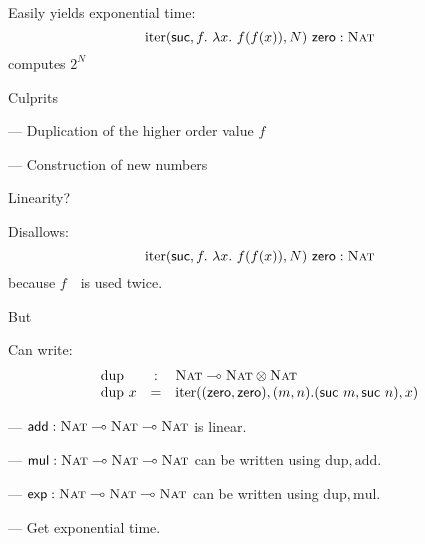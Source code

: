 \documentclass[xetex,serif,mathserif,aspectratio=169]{beamer}
\newcommand{\youtem}{\quad \textcolor{titlered!80}{---} \quad}
\newcommand{\HEAD}[1]{\textcolor{titlered}{#1}}
\begin{document}
\begin{frame}
  Easily yields exponential time:
  \begin{displaymath}
    \mathrm{iter}(\mathsf{suc},f.~\lambda x.~f(f(x)),N)~\mathsf{zero} : \textsc{Nat}
  \end{displaymath}
  computes $2^N$


  \pause

  \bigskip

  \HEAD{Culprits}

  \medskip

  \youtem Duplication of the higher order value $f$

  \smallskip

  \youtem Construction of new numbers

\end{frame}

\begin{frame}

  \HEAD{Linearity?}

  \medskip

  Disallows:
  \begin{displaymath}
    \mathrm{iter}(\mathsf{suc},f.~\lambda x.~f(f(x)),N)~\mathsf{zero} : \textsc{Nat}
  \end{displaymath}
  because $f$~~is used twice.

  \pause

  \bigskip

  \HEAD{But}

  Can write:
  \begin{displaymath}
    \begin{array}{lcl}
      \mathrm{dup} & : & \textsc{Nat} \multimap \textsc{Nat} \otimes \textsc{Nat} \\
      \mathrm{dup}~x  &=&\mathrm{iter}((\mathsf{zero},\mathsf{zero}), (m,n). (\mathsf{suc}~m, \mathsf{suc}~n), x)
    \end{array}
  \end{displaymath}

  \pause
  \youtem $\mathsf{add} : \textsc{Nat} \multimap \textsc{Nat} \multimap \textsc{Nat}$ is linear.

  \pause
  \youtem $\mathsf{mul} : \textsc{Nat} \multimap \textsc{Nat} \multimap \textsc{Nat}$ can be written using $\mathrm{dup}, \mathrm{add}$.

  \pause
  \youtem $\mathsf{exp} : \textsc{Nat} \multimap \textsc{Nat} \multimap \textsc{Nat}$ can be written using $\mathrm{dup}, \mathrm{mul}$.

  \pause
  \youtem Get exponential time.

\end{frame}
\end{document}
